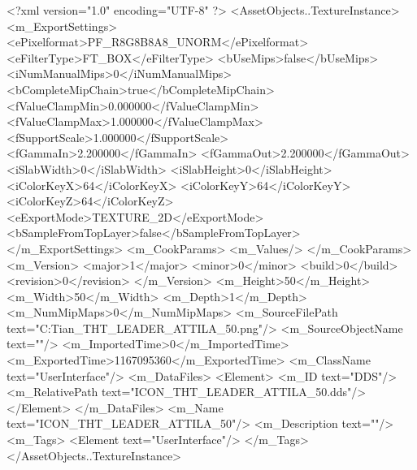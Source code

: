 <?xml version="1.0" encoding="UTF-8" ?>
<AssetObjects..TextureInstance>
	<m_ExportSettings>
		<ePixelformat>PF_R8G8B8A8_UNORM</ePixelformat>
		<eFilterType>FT_BOX</eFilterType>
		<bUseMips>false</bUseMips>
		<iNumManualMips>0</iNumManualMips>
		<bCompleteMipChain>true</bCompleteMipChain>
		<fValueClampMin>0.000000</fValueClampMin>
		<fValueClampMax>1.000000</fValueClampMax>
		<fSupportScale>1.000000</fSupportScale>
		<fGammaIn>2.200000</fGammaIn>
		<fGammaOut>2.200000</fGammaOut>
		<iSlabWidth>0</iSlabWidth>
		<iSlabHeight>0</iSlabHeight>
		<iColorKeyX>64</iColorKeyX>
		<iColorKeyY>64</iColorKeyY>
		<iColorKeyZ>64</iColorKeyZ>
		<eExportMode>TEXTURE_2D</eExportMode>
		<bSampleFromTopLayer>false</bSampleFromTopLayer>
	</m_ExportSettings>
	<m_CookParams>
		<m_Values/>
	</m_CookParams>
	<m_Version>
		<major>1</major>
		<minor>0</minor>
		<build>0</build>
		<revision>0</revision>
	</m_Version>
	<m_Height>50</m_Height>
	<m_Width>50</m_Width>
	<m_Depth>1</m_Depth>
	<m_NumMipMaps>0</m_NumMipMaps>
	<m_SourceFilePath text="C:\Users\Troy Tian\Downloads\ICON_THT_LEADER_ATTILA_50.png"/>
	<m_SourceObjectName text=""/>
	<m_ImportedTime>0</m_ImportedTime>
	<m_ExportedTime>1167095360</m_ExportedTime>
	<m_ClassName text="UserInterface"/>
	<m_DataFiles>
		<Element>
			<m_ID text="DDS"/>
			<m_RelativePath text="ICON_THT_LEADER_ATTILA_50.dds"/>
		</Element>
	</m_DataFiles>
	<m_Name text="ICON_THT_LEADER_ATTILA_50"/>
	<m_Description text=""/>
	<m_Tags>
		<Element text="UserInterface"/>
	</m_Tags>
</AssetObjects..TextureInstance>

